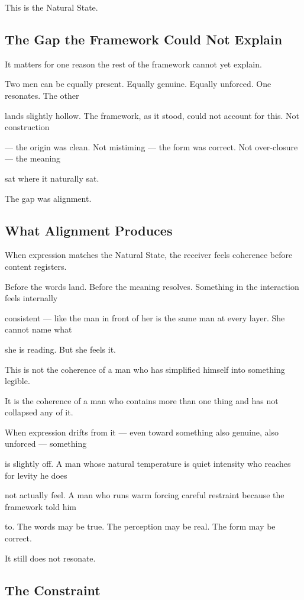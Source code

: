\documentclass[12pt, a4paper]{article}
\begin{document}
This is the Natural State.

\subsection{The Gap the Framework Could Not Explain}

It matters for one reason the rest of the framework cannot yet explain.

Two men can be equally present. Equally genuine. Equally unforced. One resonates. The other

lands slightly hollow. The framework, as it stood, could not account for this. Not construction

--- the origin was clean. Not mistiming --- the form was correct. Not over-closure --- the meaning

sat where it naturally sat.

The gap was alignment.

\subsection{What Alignment Produces}

When expression matches the Natural State, the receiver feels coherence before content registers.

Before the words land. Before the meaning resolves. Something in the interaction feels internally

consistent --- like the man in front of her is the same man at every layer. She cannot name what

she is reading. But she feels it.

This is not the coherence of a man who has simplified himself into something legible.

It is the coherence of a man who contains more than one thing and has not collapsed any of it.

When expression drifts from it --- even toward something also genuine, also unforced --- something

is slightly off. A man whose natural temperature is quiet intensity who reaches for levity he does

not actually feel. A man who runs warm forcing careful restraint because the framework told him

to. The words may be true. The perception may be real. The form may be correct.

It still does not resonate.

\subsection{The Constraint}
\end{document}
